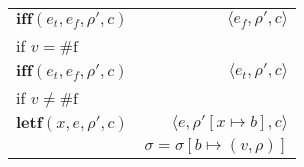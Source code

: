 \documentclass[12pt,draft]{article}
\begin{document}
\begin{center}
\begin{tabular}{l | r}
\hline
$\textbf{iff}(e_t , e_f , \rho' , c) $ 
& $ \langle e_f , \rho' , c \rangle $ \\
if $ v = \text{\#f} $ &  \\
\hline
$\textbf{iff}(e_t , e_f , \rho' , c) $ 
& $ \langle e_t , \rho' , c \rangle $ \\
if $ v \neq \text{\#f} $ & \\
\hline
$\textbf{letf}(x, e, \rho', c) $
& $ \langle e, \rho'[x \longmapsto b] , c \rangle $ \\
& $ \sigma = \sigma[b \longmapsto (v, \rho)] $ \\
\hline
\end{tabular}
\end{center}
\end{document}
